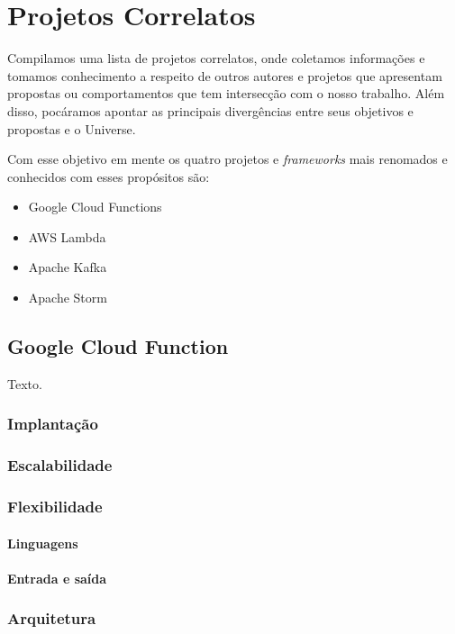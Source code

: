 \chapter{Projetos Correlatos}

Compilamos uma lista de projetos correlatos, onde coletamos informações e tomamos conhecimento a respeito de outros autores e projetos que apresentam propostas ou comportamentos que tem intersecção com o nosso trabalho. Além disso, pocáramos apontar as principais divergências entre seus objetivos e propostas e o Universe.
\bigskip

Com esse objetivo em mente os quatro projetos e \textit{frameworks} mais renomados e conhecidos com esses propósitos são:
\begin{itemize}
    \item Google Cloud Functions
    \item AWS Lambda
    \item Apache Kafka
    \item Apache Storm
\end{itemize}

\section{Google Cloud Function}

Texto.

\subsection{Implantação}

\subsection{Escalabilidade}

\subsection{Flexibilidade}

\subsubsection{Linguagens}
\subsubsection{Entrada e saída}

\subsection{Arquitetura}

